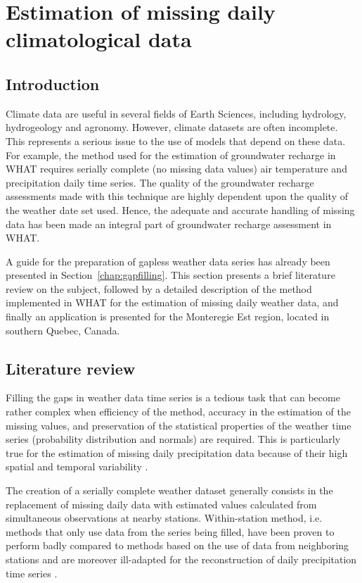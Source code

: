 \documentclass[WHATMANUAL.tex]{subfiles}
\begin{document}
\chapter{Estimation of missing daily climatological data}\label{chap:Missing_weather_theory}

\section{Introduction}

Climate data are useful in several fields of Earth Sciences, including hydrology, hydrogeology and agronomy. However, climate datasets are often incomplete. This represents a serious issue to the use of models that depend on these data. For example, the method used for the estimation of groundwater recharge in WHAT requires serially complete (no missing data values) air temperature and precipitation daily time series. The quality of the groundwater recharge assessments made with this technique are highly dependent upon the quality of the weather date set used. Hence, the adequate and accurate handling of missing data has been made an integral part of groundwater recharge assessment in WHAT.

A guide for the preparation of gapless weather data series has already been presented in Section~\ref{chap:gapfilling}. This section presents a brief literature review on the subject, followed by a detailed description of the method implemented in WHAT for the estimation of missing daily weather data, and finally an application is presented for the Monteregie Est region, located in southern Quebec, Canada. 

\section{Literature review}

Filling the gaps in weather data time series is a tedious task that can become rather complex when efficiency of the method, accuracy in the estimation of the missing values, and preservation of the statistical properties of the weather time series (probability distribution and normals) are required. This is particularly true for the estimation of missing daily precipitation data because of their high spatial and temporal variability \citep{simolo_improving_2010}. 

The creation of a serially complete weather dataset generally consists in the replacement of missing daily data with estimated values calculated from simultaneous observations at nearby stations. Within-station method, i.e. methods that only use data from the series being filled, have been proven to perform badly compared to methods based on the use of data from neighboring stations and are moreover ill-adapted for the reconstruction of daily precipitation time series \citep{eischeid_quality_1995,simolo_improving_2010,kemp_estimating_1983}.
\end{document}
